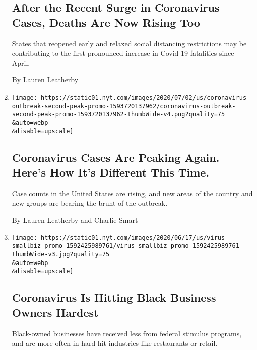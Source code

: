 \begin{enumerate}
  \hypertarget{after-the-recent-surge-in-coronavirus-cases-deaths-are-now-rising-too}{%
  \subsection{After the Recent Surge in Coronavirus Cases, Deaths Are
  Now Rising
  Too}\label{after-the-recent-surge-in-coronavirus-cases-deaths-are-now-rising-too}}

  States that reopened early and relaxed social distancing restrictions
  may be contributing to the first pronounced increase in Covid-19
  fatalities since April.

  By Lauren Leatherby
\item
  \href{/interactive/2020/07/02/us/coronavirus-cases-increase.html}{}

  \texttt{[image: https://static01.nyt.com/images/2020/07/02/us/coronavirus-outbreak-second-peak-promo-1593720137962/coronavirus-outbreak-second-peak-promo-1593720137962-thumbWide-v4.png?quality=75\\\&auto=webp\\\&disable=upscale]}

  \hypertarget{coronavirus-cases-are-peaking-again-heres-how-its-different-this-time}{%
  \subsection{Coronavirus Cases Are Peaking Again. Here's How It's
  Different This
  Time.}\label{coronavirus-cases-are-peaking-again-heres-how-its-different-this-time}}

  Case counts in the United States are rising, and new areas of the
  country and new groups are bearing the brunt of the outbreak.

  By Lauren Leatherby and Charlie Smart
\item
  \href{/interactive/2020/06/18/us/coronavirus-black-owned-small-business.html}{}

  \texttt{[image: https://static01.nyt.com/images/2020/06/17/us/virus-smallbiz-promo-1592425989761/virus-smallbiz-promo-1592425989761-thumbWide-v3.jpg?quality=75\\\&auto=webp\\\&disable=upscale]}

  \hypertarget{coronavirus-is-hitting-black-business-owners-hardest}{%
  \subsection{Coronavirus Is Hitting Black Business Owners
  Hardest}\label{coronavirus-is-hitting-black-business-owners-hardest}}

  Black-owned businesses have received less from federal stimulus
  programs, and are more often in hard-hit industries like restaurants
  or retail.


\end{enumerate}
